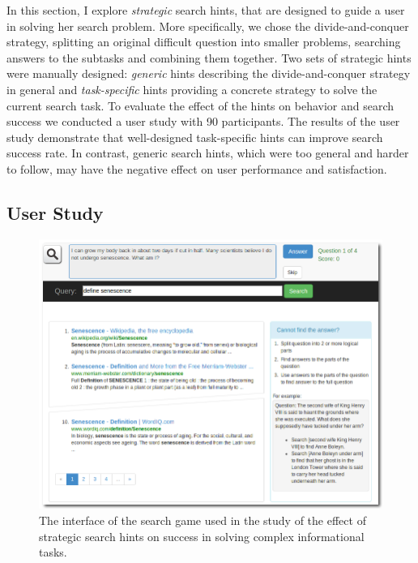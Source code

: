 In this section, I explore \textit{strategic} search hints, that are designed to guide a user in solving her search problem.
More specifically, we chose the divide-and-conquer strategy, \ie splitting an original difficult question into smaller problems, searching answers to the subtasks and combining them together.
Two sets of strategic hints were manually designed: \textit{generic} hints describing the divide-and-conquer strategy in general and \textit{task-specific} hints providing a concrete strategy to solve the current search task.
To evaluate the effect of the hints on behavior and search success we conducted a user study with 90 participants.
The results of the user study demonstrate that well-designed task-specific hints can improve search success rate.
In contrast, generic search hints, which were too general and harder to follow, may have the negative effect on user performance and satisfaction.

\subsection{User Study}
\label{section:conversation:hints:user-study}

\begin{figure}[t]
\centering
\includegraphics[width=\textwidth]{img/hints_ufindit}
\caption{The interface of the search game used in the study of the effect of strategic search hints on success in solving complex informational tasks.}
\label{figure:conversation:hints:ufindit}
\end{figure}


